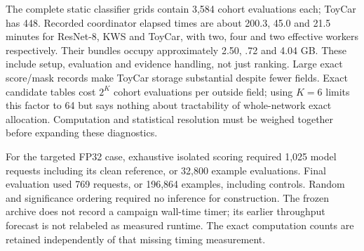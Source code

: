 The complete static classifier grids contain 3,584 cohort evaluations each;
ToyCar has 448. Recorded coordinator elapsed times are about 200.3, 45.0 and
21.5 minutes for ResNet-8, KWS and ToyCar, with two, four and two effective
workers respectively. Their bundles occupy approximately 2.50, .72 and 4.04 GB.
These include setup, evaluation and evidence handling, not just ranking.
Large exact score/mask records make ToyCar storage substantial despite fewer
fields. Exact candidate tables cost $2^K$ cohort evaluations per outside field;
using $K=6$ limits this factor to 64 but says nothing about tractability of
whole-network exact allocation. Computation and statistical resolution must be
weighed together before expanding these diagnostics.

For the targeted FP32 case, exhaustive isolated scoring required 1,025 model
requests including its clean reference, or 32,800 example evaluations. Final
evaluation used 769 requests, or 196,864 examples, including controls. Random
and significance ordering required no inference for construction. The frozen
archive does not record a campaign wall-time timer; its earlier throughput
forecast is not relabeled as measured runtime. The exact computation counts
are retained independently of that missing timing measurement.
